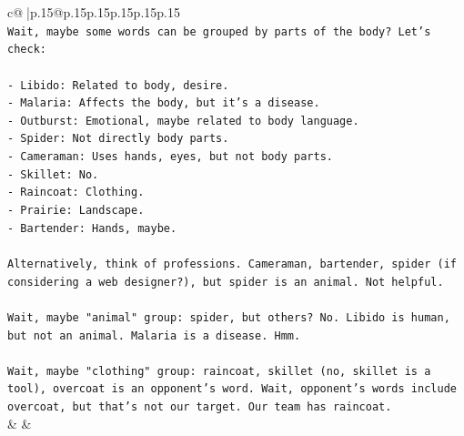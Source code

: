 \documentclass{article}
\begin{document}
{\begin{supertabular}{c@{$\;$}|p{.15\linewidth}@{}p{.15\linewidth}p{.15\linewidth}p{.15\linewidth}p{.15\linewidth}p{.15\linewidth}}
{{{\\ 
\texttt{Wait, maybe some words can be grouped by parts of the body? Let's check:} \\
\\ 
\texttt{{-} Libido: Related to body, desire.} \\
\texttt{{-} Malaria: Affects the body, but it's a disease.} \\
\texttt{{-} Outburst: Emotional, maybe related to body language.} \\
\texttt{{-} Spider: Not directly body parts.} \\
\texttt{{-} Cameraman: Uses hands, eyes, but not body parts.} \\
\texttt{{-} Skillet: No.} \\
\texttt{{-} Raincoat: Clothing.} \\
\texttt{{-} Prairie: Landscape.} \\
\texttt{{-} Bartender: Hands, maybe.} \\
\\ 
\texttt{Alternatively, think of professions. Cameraman, bartender, spider (if considering a web designer?), but spider is an animal. Not helpful.} \\
\\ 
\texttt{Wait, maybe "animal" group: spider, but others? No. Libido is human, but not an animal. Malaria is a disease. Hmm.} \\
\\ 
\texttt{Wait, maybe "clothing" group: raincoat, skillet (no, skillet is a tool), overcoat is an opponent's word. Wait, opponent's words include overcoat, but that's not our target. Our team has raincoat.} \\
            }
        }
    }
    & & \\ \\


\end{supertabular}}
\end{document}
